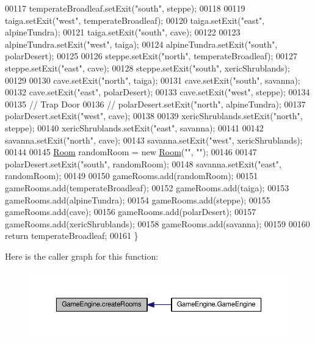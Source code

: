 \begin{DoxyCode}
00117         temperateBroadleaf.setExit(\textcolor{stringliteral}{"south"}, steppe);
00118 
00119         taiga.setExit(\textcolor{stringliteral}{"west"}, temperateBroadleaf);
00120         taiga.setExit(\textcolor{stringliteral}{"east"}, alpineTundra);
00121         taiga.setExit(\textcolor{stringliteral}{"south"}, cave);
00122 
00123         alpineTundra.setExit(\textcolor{stringliteral}{"west"}, taiga);
00124         alpineTundra.setExit(\textcolor{stringliteral}{"south"}, polarDesert);
00125 
00126         steppe.setExit(\textcolor{stringliteral}{"north"}, temperateBroadleaf);
00127         steppe.setExit(\textcolor{stringliteral}{"east"}, cave);
00128         steppe.setExit(\textcolor{stringliteral}{"south"}, xericShrublands);
00129 
00130         cave.setExit(\textcolor{stringliteral}{"north"}, taiga);
00131         cave.setExit(\textcolor{stringliteral}{"south"}, savanna);
00132         cave.setExit(\textcolor{stringliteral}{"east"}, polarDesert);
00133         cave.setExit(\textcolor{stringliteral}{"west"}, steppe);
00134 
00135         \textcolor{comment}{// Trap Door}
00136         \textcolor{comment}{// polarDesert.setExit("north", alpineTundra);}
00137         polarDesert.setExit(\textcolor{stringliteral}{"west"}, cave);
00138 
00139         xericShrublands.setExit(\textcolor{stringliteral}{"north"}, steppe);
00140         xericShrublands.setExit(\textcolor{stringliteral}{"east"}, savanna);
00141 
00142         savanna.setExit(\textcolor{stringliteral}{"north"}, cave);
00143         savanna.setExit(\textcolor{stringliteral}{"west"}, xericShrublands);
00144 
00145         \hyperlink{classRoom}{Room} randomRoom = \textcolor{keyword}{new} \hyperlink{classRoom}{Room}(\textcolor{stringliteral}{""}, \textcolor{stringliteral}{""});
00146 
00147         polarDesert.setExit(\textcolor{stringliteral}{"south"}, randomRoom);
00148         savanna.setExit(\textcolor{stringliteral}{"east"}, randomRoom);
00149 
00150         gameRooms.add(randomRoom);
00151         gameRooms.add(temperateBroadleaf);
00152         gameRooms.add(taiga);
00153         gameRooms.add(alpineTundra);
00154         gameRooms.add(steppe);
00155         gameRooms.add(cave);
00156         gameRooms.add(polarDesert);
00157         gameRooms.add(xericShrublands);
00158         gameRooms.add(savanna);
00159 
00160         \textcolor{keywordflow}{return} temperateBroadleaf;
00161     \}
\end{DoxyCode}


Here is the caller graph for this function\-:
\nopagebreak
\begin{figure}[H]
\begin{center}
\leavevmode
\includegraphics[width=350pt]{classGameEngine_a9410d92f7d0e6820059b1d07da364b09_icgraph}
\end{center}
\end{figure}


